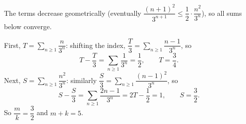The terms decrease geometrically (eventually $\dfrac{(n+1)^2}{3^{n+1}}\le\dfrac12\cdot\dfrac{n^2}{3^n}$), so all sums below converge.

First, $T=\displaystyle\sum_{n\ge1}\dfrac{n}{3^n}$: shifting the index, $\dfrac T3=\displaystyle\sum_{n\ge1}\dfrac{n-1}{3^n}$, so
\[T-\dfrac T3=\sum_{n\ge1}\dfrac1{3^n}=\dfrac12,\qquad T=\dfrac34.\]
Next, $S=\displaystyle\sum_{n\ge1}\dfrac{n^2}{3^n}$: similarly $\dfrac S3=\displaystyle\sum_{n\ge1}\dfrac{(n-1)^2}{3^n}$, so
\[S-\dfrac S3=\sum_{n\ge1}\dfrac{2n-1}{3^n}=2T-\dfrac12=1,\qquad S=\dfrac32.\]
So $\dfrac mk=\dfrac32$ and $m+k=\boxed{5}$.
